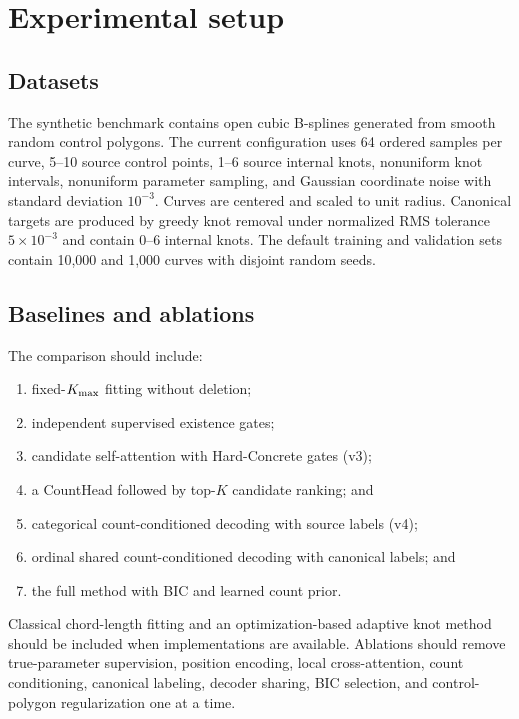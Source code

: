 \section{Experimental setup}
\label{sec:experiments}

\subsection{Datasets}

The synthetic benchmark contains open cubic B-splines generated from smooth
random control polygons. The current configuration uses 64 ordered samples per
curve, 5--10 source control points, 1--6 source internal knots, nonuniform knot intervals,
nonuniform parameter sampling, and Gaussian coordinate noise with standard
deviation $10^{-3}$. Curves are centered and scaled to unit radius. Canonical
targets are produced by greedy knot removal under normalized RMS tolerance
$5\times10^{-3}$ and contain 0--6 internal knots. The default training and validation sets contain 10,000 and
1,000 curves with disjoint random seeds.


\subsection{Baselines and ablations}

The comparison should include:
\begin{enumerate}
  \item fixed-$K_{\max}$ fitting without deletion;
  \item independent supervised existence gates;
  \item candidate self-attention with Hard-Concrete gates (v3);
  \item a CountHead followed by top-$K$ candidate ranking; and
  \item categorical count-conditioned decoding with source labels (v4);
  \item ordinal shared count-conditioned decoding with canonical labels; and
  \item the full method with BIC and learned count prior.
\end{enumerate}
Classical chord-length fitting and an optimization-based adaptive knot method
should be included when implementations are available. Ablations should remove
true-parameter supervision, position encoding, local cross-attention, count
conditioning, canonical labeling, decoder sharing, BIC selection, and
control-polygon regularization one at a time.

